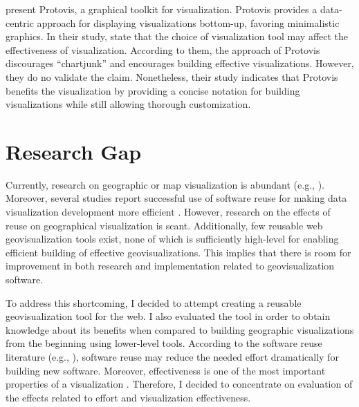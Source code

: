 \citet{bostock_protovis:_2009} present Protovis, a graphical toolkit for visualization. Protovis provides a data-centric approach for displaying visualizations bottom-up, favoring minimalistic graphics. In their study, \citeauthor{bostock_protovis:_2009} state that the choice of visualization tool may affect the effectiveness of visualization. According to them, the approach of Protovis discourages ``chartjunk'' and encourages building effective visualizations. However, they do no validate the claim. Nonetheless, their study indicates that Protovis benefits the visualization by providing a concise notation for building visualizations while still allowing thorough customization.

\section{Research Gap}

Currently, research on geographic or map visualization is abundant (e.g., \citealt{kraak_cartographic_1998,kraak_cartography_2011,slocum_thematic_2014,schlichtmann_visualization_2002}). Moreover, several studies report successful use of software reuse for making data visualization development more efficient \citep{heer_prefuse:_2005,bostock_protovis:_2009}. However, research on the effects of reuse on geographical visualization is scant. Additionally, few reusable web geovisualization tools exist, none of which is sufficiently high-level for enabling efficient building of effective geovisualizations. This implies that there is room for improvement in both research and implementation related to geovisualization software.

To address this shortcoming, I decided to attempt creating a reusable geovisualization tool for the web. I also evaluated the tool in order to obtain knowledge about its benefits when compared to building geographic visualizations from the beginning using lower-level tools. According to the software reuse literature (e.g., \citealt{mohagheghi_empirical_2008,boehm_managing_1999}), software reuse may reduce the needed effort dramatically for building new software. Moreover, effectiveness is one of the most important properties of a visualization \citep{kraak_cartographic_1998}. Therefore, I decided to concentrate on evaluation of the effects related to effort and visualization effectiveness.
